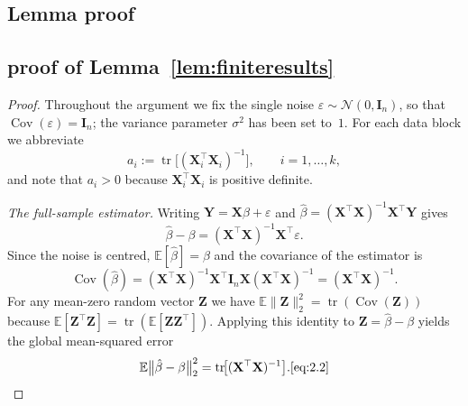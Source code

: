 \documentclass[11pt]{article}
\numberwithin{equation}{section}
\theoremstyle{plain}
\theoremstyle{definition}
\theoremstyle{remark}
\begin{document}
\begin{appendix}

\section{Lemma proof}





\subsection{proof of Lemma~\ref{lem:finiteresults}}
\begin{proof}
    Throughout the argument we fix the single noise
      $\varepsilon\sim\mathcal N(0,\mathbf{I}_n)$, so that
      $\operatorname{Cov}(\varepsilon)=\mathbf{I}_n$; the variance parameter
      $\sigma^{2}$ has been set to~$1$.
      For each data block we abbreviate
      \[
        a_i
        :=\operatorname{tr}\!\bigl[(\mathbf{X}_i^{\top}\mathbf{X}_i)^{-1}\bigr],
        \qquad i=1,\dots,k,
      \]
      and note that $a_i>0$ because $\mathbf{X}_i^{\top}\mathbf{X}_i$ is positive definite.

      \medskip
      \textit{The full-sample estimator.}
      Writing $\mathbf{Y}=\mathbf{X}\beta+\varepsilon$ and
      $\hat\beta=(\mathbf{X}^{\top}\mathbf{X})^{-1}\mathbf{X}^{\top}\mathbf{Y}$ gives
      \[
        \hat\beta-\beta
          =(\mathbf{X}^{\top}\mathbf{X})^{-1}\mathbf{X}^{\top}\varepsilon .
      \]
      Since the noise is centred, $\mathbb E[\hat\beta]=\beta$ and the
      covariance of the estimator is
      \[
        \operatorname{Cov}(\hat\beta)
          =(\mathbf{X}^{\top}\mathbf{X})^{-1}\mathbf{X}^{\top}\mathbf{I}_n\mathbf{X}(\mathbf{X}^{\top}\mathbf{X})^{-1}
          =(\mathbf{X}^{\top}\mathbf{X})^{-1}.
      \]
      For any mean-zero random vector $\mathbf{Z}$ we have
      $\mathbb E\|\mathbf{Z}\|_{2}^{2}=\operatorname{tr}(\operatorname{Cov}(\mathbf{Z}))$
      because
      $\mathbb E[\mathbf{Z}^{\top}\mathbf{Z}]=\operatorname{tr}(\mathbb E[\mathbf{Z}\mathbf{Z}^{\top}])$.
      Applying this identity to $\mathbf{Z}=\hat\beta-\beta$ yields the global
      mean-squared error
      \[
        \mathbb E\bigl\|\hat\beta-\beta\bigr\|_{2}^{2}
          =\operatorname{tr}\!\bigl[(\mathbf{X}^{\top}\mathbf{X})^{-1}\bigr].\ref{eq:2.2}
      \]


\end{proof}
\end{appendix}
\end{document}

